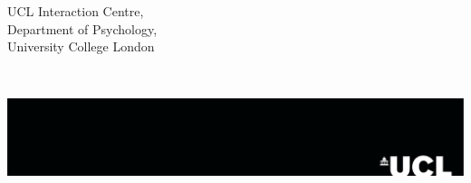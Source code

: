 \begin{titlepage}



\begin{minipage}{0.4\textwidth}
\begin{center}
UCL Interaction Centre,\\
Department of Psychology, \\
University College London
\end{center}
\end{minipage}
~

\vfill %


\begin{flushright} \large
\includegraphics[width=\textwidth]{images/logo.pdf}%
\end{flushright}


 




\end{titlepage}
%